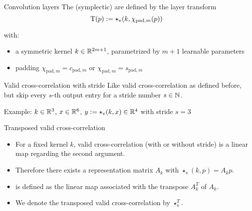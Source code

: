 \begin{frame}[c]{Convolution layers}
  The (symplectic)  are defined by the layer transform
  \begin{equation*}
    \mathrm{T}(p) := \star_{\text{v}}(k,\chi_{\text{pad},m}(p))
  \end{equation*}

  with:
  \begin{itemize}
    \item a symmetric kernel $k \in \mathbb{R}^{2m+1}$, 
    parametrized by $m+1$ learnable parameters
    \item padding
    $\chi_{\text{pad},m} = c_{\text{pad},m}$ or $\chi_{\text{pad},m} = s_{\text{pad},m}$
  \end{itemize}
\end{frame}

\begin{frame}{Valid cross-correlation with stride}
  Like valid cross-correlation as defined before,\\
  but skip every $s$-th output entry
  for a stride number $s \in \mathbb{N}$.

  \vspace{0.6cm}
  Example:
  $k \in \mathbb{R}^3$,
  $x \in \mathbb{R}^6$,
  $y := \star_{\text{v}}(k,x) \in \mathbb{R}^4$ with stride $s=3$

  \vspace{0.3cm}
  \centering
\end{frame}

\begin{frame}[c]{Transposed valid cross-correlation}
  \begin{itemize}
    \item For a fixed kernel $k$, valid cross-correlation (with or without stride) 
    is a linear map regarding the second argument. 
    \item Therefore there exists a representation matrix $A_{k}$ with 
    $\star_{\text{v}}(k,p) = A_{k}p$.
    \item {}
    is defined as the linear map associated with the transpose $A_{k}^T$ of $A_{k}$.
    \item We denote the transposed valid cross-correlation by $\star_{\text{v}}^T$.
  \end{itemize}
\end{frame}

